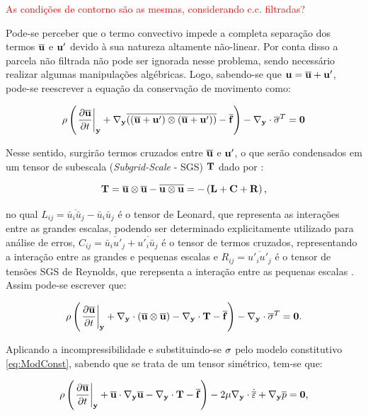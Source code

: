 \documentclass[_ArquivoPrincipal.tex]{subfiles}
\begin{document}
\textcolor{red}{As condições de contorno são as mesmas, considerando c.c. filtradas?}

Pode-se perceber que o termo convectivo impede a completa separação dos termos $\overline{\mathbf{u}}$ e $\mathbf{u}'$ devido à sua natureza altamente não-linear. Por conta disso a parcela não filtrada não pode ser ignorada nesse problema, sendo necessário realizar algumas manipulações algébricas. Logo, sabendo-se que $\mathbf{u}=\overline{\mathbf{u}}+\mathbf{u}'$, pode-se reescrever a equação da conservação de movimento como:

\begin{equation}
    \rho\left({\left.\frac{\partial{\overline{\mathbf{u}}}}{\partial{t}}\right|_{\mathbf{y}}+\mathbf{\nabla_y}\overline{((\overline{\mathbf{u}}+\mathbf{u}')\otimes(\overline{\mathbf{u}}+\mathbf{u}'))}-\overline{\mathbf{f}}}\right)-\mathbf{\nabla_y}\cdot\overline{\mathbf{\sigma}}^T=\mathbf{0}
\end{equation}

Nesse sentido, surgirão termos cruzados entre $\overline{\mathbf{u}}$ e $\mathbf{u}'$, o que serão condensados em um tensor de subescala (\textit{Subgrid-Scale} - SGS) $\mathbf{T}$ dado por \cite{piomelli1999large,hughes2000large}:

\begin{equation}
    \mathbf{T}=\overline{\mathbf{u}}\otimes\overline{\mathbf{u}}-\overline{\mathbf{u}\otimes\mathbf{u}}=-\left({\mathbf{L}+\mathbf{C}+\mathbf{R}}\right)\text{,}
\end{equation}

\noindent no qual $L_{ij}=\overline{\bar{u}_i\bar{u}_j}-\bar{u}_i\bar{u}_j$ é o tensor de Leonard, que representa as interações entre as grandes escalas, podendo ser determinado explicitamente utilizado para análise de erros, $C_{ij}=\overline{\bar{u}_iu'_j}+\overline{u'_i\bar{u}_j}$ é o tensor de termos cruzados, representando a interação entre as grandes e pequenas escalas e $R_{ij}=\overline{u'_iu'_j}$ é o tensor de tensões SGS de Reynolds, que rerepsenta a interação entre as pequenas escalas \cite{piomelli1999large}. Assim pode-se escrever que:

\begin{equation}
    \rho\left({\left.\frac{\partial{\overline{\mathbf{u}}}}{\partial{t}}\right|_{\mathbf{y}}+\mathbf{\nabla_y}\cdot(\overline{\mathbf{u}}\otimes\overline{\mathbf{u}})-\mathbf{\nabla_y}\cdot\mathbf{T}-\overline{\mathbf{f}}}\right)-\mathbf{\nabla_y}\cdot\overline{\mathbf{\sigma}}^T=\mathbf{0}\text{.}
\end{equation}

Aplicando a incompressibilidade e substituindo-se $\mathbf{\sigma}$ pelo modelo constitutivo \ref{eq:ModConst}, sabendo que se trata de um tensor simétrico, tem-se que:

\begin{equation}
    \rho\left({\left.\frac{\partial{\overline{\mathbf{u}}}}{\partial{t}}\right|_{\mathbf{y}}+\overline{\mathbf{u}}\cdot\mathbf{\nabla_y}\overline{\mathbf{u}}-\mathbf{\nabla_y}\cdot\mathbf{T}-\overline{\mathbf{f}}}\right)-2\mu\mathbf{\nabla_y}\cdot\dot{\overline{\mathbf{\varepsilon}}}+\mathbf{\nabla_y} \overline{p}=\mathbf{0}\text{,}\label{eq:ConMasLES}
\end{equation}
\end{document}
